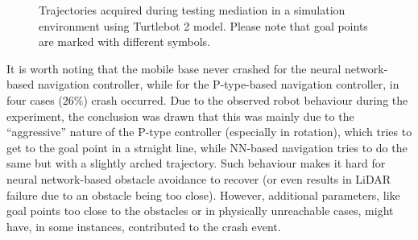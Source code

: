 \begin{figure}
    \centering
    \hfill
    \caption{Trajectories acquired during testing mediation in a simulation environment using Turtlebot 2 model. Please note that goal points are marked with different symbols.}
    \label{Fig:simulationTest}
\end{figure}

It is worth noting that the mobile base never crashed for the neural network-based navigation controller, while for the P-type-based navigation controller, in four cases ($26\%$) crash occurred. Due to the observed robot behaviour during the experiment, the conclusion was drawn that this was mainly due to the ``aggressive'' nature of the P-type controller (especially in rotation), which tries to get to the goal point in a straight line, while NN-based navigation tries to do the same but with a slightly arched trajectory. Such behaviour makes it hard for neural network-based obstacle avoidance to recover (or even results in LiDAR failure due to an obstacle being too close). However, additional parameters, like goal points too close to the obstacles or in physically unreachable cases, might have, in some instances, contributed to the crash event. 

